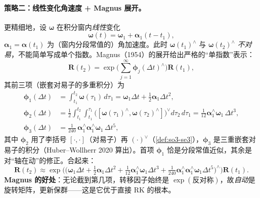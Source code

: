 \paragraph{策略二：线性变化角速度 + Magnus 展开。}更精细地，设 $\boldsymbol{\omega}$ 在积分窗内\emph{线性}变化
\begin{equation}
  \boldsymbol{\omega}(t)=\boldsymbol{\omega}_1+\boldsymbol{\alpha}_1(t-t_1),
  \label{eq:lk-omega-lin}
\end{equation}
$\boldsymbol{\alpha}_1=\boldsymbol{\alpha}(t_1)$ 为（窗内分段常值的）角加速度。此时 $\boldsymbol{\omega}(t_1)^\wedge$ 与 $\boldsymbol{\omega}(t_2)^\wedge$ \emph{不对易}，不能简单写成单个指数。Magnus（1954）的展开给出严格的“单指数”表示\cite{barfoot2024state}：
\begin{equation}
  \mathbf{R}(t_2)=\exp\!\Big(\sum_{j=1}^{\infty}\boldsymbol{\phi}_j(\Delta t)^\wedge\Big)\mathbf{R}(t_1),
  \label{eq:lk-magnus}
\end{equation}
其前三项（嵌套对易子的多重积分）为
\begin{align}
  \boldsymbol{\phi}_1(\Delta t)&=\int_{t_1}^{t_2}\boldsymbol{\omega}(\tau_1)\,d\tau_1=\boldsymbol{\omega}_1\Delta t+\tfrac12\boldsymbol{\alpha}_1\Delta t^2, \label{eq:lk-magnus1}\\
  \boldsymbol{\phi}_2(\Delta t)&=\tfrac12\!\int_{t_1}^{t_2}\!\!\int_{t_1}^{\tau_1}\!\big([\boldsymbol{\omega}(\tau_1)^\wedge,\boldsymbol{\omega}(\tau_2)^\wedge]\big)^\vee d\tau_2\,d\tau_1=\tfrac{1}{12}\boldsymbol{\alpha}_1^\wedge\boldsymbol{\omega}_1\,\Delta t^3, \label{eq:lk-magnus2}\\
  \boldsymbol{\phi}_3(\Delta t)&=\tfrac{1}{240}\,\boldsymbol{\alpha}_1^\wedge\boldsymbol{\alpha}_1^\wedge\boldsymbol{\omega}_1\,\Delta t^5, \label{eq:lk-magnus3}
\end{align}
其中 $\boldsymbol{\phi}_2$ 用了李括号 $[\cdot,\cdot]$（对易子）再 $(\cdot)^\vee$（\cref{def:so3-se3}），$\boldsymbol{\phi}_3$ 是三重嵌套对易子的积分（Huber--Wollherr 2020 算出）\cite{barfoot2024state}。首项 $\boldsymbol{\phi}_1$ 恰是分段常值近似，其余是对“轴在动”的修正。合起来：
\begin{equation}
  \mathbf{R}(t_2)\approx\exp\!\Big(\!\big(\boldsymbol{\omega}_1\Delta t+\tfrac12\boldsymbol{\alpha}_1\Delta t^2+\tfrac{1}{12}\boldsymbol{\alpha}_1^\wedge\boldsymbol{\omega}_1\Delta t^3+\tfrac{1}{240}\boldsymbol{\alpha}_1^\wedge\boldsymbol{\alpha}_1^\wedge\boldsymbol{\omega}_1\Delta t^5\big)^\wedge\Big)\mathbf{R}(t_1).
  \label{eq:lk-magnus-assembled}
\end{equation}
\textbf{Magnus 的好处}：无论截到第几项，转移因子始终是 $\exp(\text{反对称})$，故\emph{自动}是旋转矩阵，更新保群——这是它优于直接 RK 的根本。

